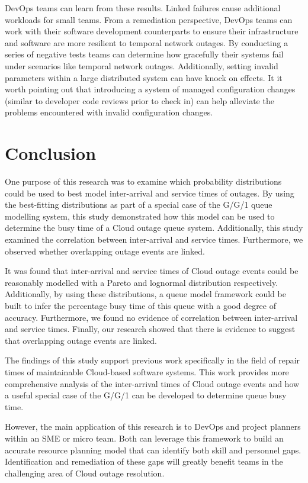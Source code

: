 \documentclass[5p]{elsarticle}
\begin{document}
DevOps teams can learn from these results. Linked failures cause additional workloads for small teams. From a remediation perspective, DevOps teams can work with their software development counterparts to ensure their infrastructure and software are more resilient to temporal network outages. By conducting a series of negative tests teams can determine how gracefully their systems fail under scenarios like temporal network outages. Additionally, setting invalid parameters within a large distributed system can have knock on effects. It it worth pointing out that introducing a system of managed configuration changes (similar to developer code reviews prior to check in) can help alleviate the problems encountered with invalid configuration changes.

\section{Conclusion}

One purpose of this research was to examine which probability distributions could be used to best model inter-arrival and service times of outages. By using the best-fitting distributions as part of a special case of the G/G/1 queue modelling system, this study demonstrated how this model can be used to determine the busy time of a Cloud outage queue system. Additionally, this study examined the correlation between inter-arrival and service times. Furthermore, we observed whether overlapping outage events are  linked.

It was found that inter-arrival and service times of Cloud outage events could be reasonably modelled with a Pareto and lognormal distribution respectively. Additionally, by using these distributions, a queue model framework could be built to infer the percentage busy time of this queue with a good degree of accuracy. Furthermore, we found no evidence of correlation between inter-arrival and service times. Finally, our research showed that there is evidence to suggest that overlapping outage events are linked.

The findings of this study support previous work specifically in the field of repair times of maintainable Cloud-based software systems. This work provides  more comprehensive analysis of the inter-arrival times of Cloud outage events and how a useful special case of the G/G/1 can be developed to determine queue busy time. 

However, the main application of this research is to DevOps and project planners within an SME or micro team. Both can leverage this framework to build an accurate resource planning model that can identify both skill and personnel gaps. Identification and remediation of these gaps will greatly benefit teams in the challenging area of Cloud outage resolution.
\end{document}
